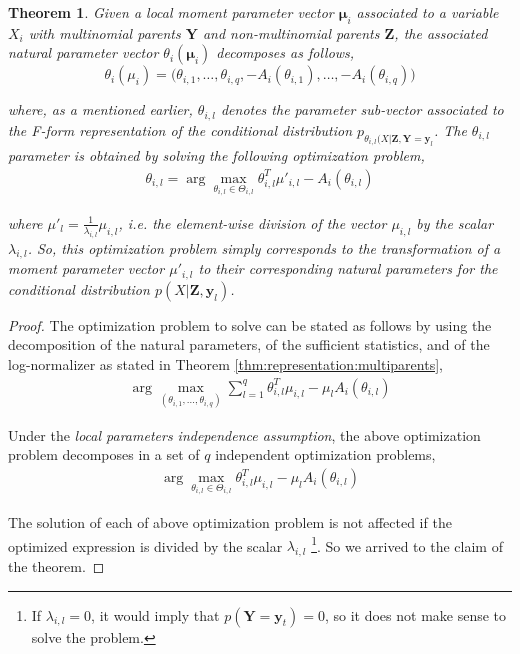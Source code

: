 \documentclass[11pt, oneside]{article}   	%
\newtheorem{theorem}{Theorem}
\newcommand{\bm}{\mathbf}
\numberwithin{figure}{section}
\numberwithin{equation}{section}
\numberwithin{table}{section}
\theoremstyle{definition}
\begin{document}
\begin{theorem}
\label{thm:MomentToNatural}
Given a local moment parameter vector $\bm \mu_i$ associated to a variable $X_i$ with multinomial parents $\bm Y$ and non-multinomial parents $\bm Z$, the associated natural parameter vector $\theta_i(\bm \mu_i)$ decomposes as follows,
$$ \theta_i(\mu_i) = \big(\theta_{i,1}, \ldots, \theta_{i,q}, -A_i(\theta_{i,1}), \ldots,-A_i(\theta_{i,q})\big)$$

\noindent where, as a mentioned earlier, $\theta_{i,l}$ denotes the parameter sub-vector associated to the F-form representation of the conditional distribution $p_{\theta_{i,l}(X|\bm Z,\bm Y  =\bm y_l}$. The $\theta_{i,l}$ parameter is obtained by solving the following optimization problem, 
\begin{eqnarray*}
\theta_{i,l} = \arg\max_{\theta_{i,l} \in \Theta_{i,l}} \theta_{i,l}^T \mu'_{i,l}- A_i(\theta_{i,l})
\end{eqnarray*}

\noindent where $\mu'_l =\frac{1}{\lambda_{i,l}}\mu_{i,l}$, i.e. the element-wise division of the vector $\mu_{i,l}$ by the scalar $\lambda_{i,l}$. So, this optimization problem simply corresponds to the transformation of a moment parameter vector $\mu'_{i,l}$ to their corresponding natural parameters for the conditional distribution $p(X|\bm Z, \bm y_l)$.
\end{theorem}
\begin{proof}
The optimization problem to solve can be stated as follows by using the decomposition of the natural parameters, of the sufficient statistics, and of the log-normalizer as stated in Theorem \ref{thm:representation:multiparents}, 
\begin{eqnarray*}
\arg\max_{(\theta_{i,1},\ldots, \theta_{i,q})} \sum_{l=1}^q \theta_{i,l}^T \mu_{i,l}- \mu_l A_i(\theta_{i,l})
\end{eqnarray*}

Under the \textit{local parameters independence assumption}, the above optimization problem decomposes in a set of $q$ independent optimization problems, 
\begin{eqnarray*}
\arg\max_{\theta_{i,l} \in \Theta_{i,l}} \theta_{i,l}^T \mu_{i,l}- \mu_l A_i(\theta_{i,l})
\end{eqnarray*}

The solution of each of above optimization problem is not affected if the optimized expression is divided by the scalar $\lambda_{i,l}$ \footnote{If $\lambda_{i,l}=0$, it would imply that $p(\bm Y= \bm y_t)=0$, so it does not make sense to solve the problem.}. So we arrived to the claim of the theorem. 
\end{proof}
\end{document}
